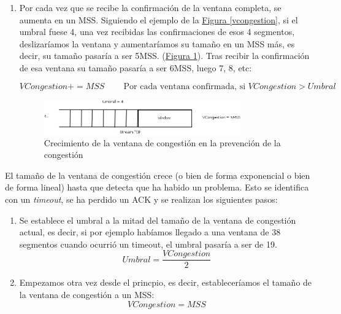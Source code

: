 \documentclass[10pt,a4paper,spanish]{report}
\begin{document}
\begin{enumerate}[\color{tema3}{$\bigstar$}]
  \item Por cada vez que se recibe la confirmación de la ventana completa, se aumenta en un MSS. Siguiendo el ejemplo de la \hyperref[vcongestion]{Figura \ref*{vcongestion}}, si el umbral fuese 4, una vez recibidas las confirmaciones de esos 4 segmentos, deslizaríamos la ventana y aumentaríamos su tamaño en un MSS más, es decir, su tamaño pasaría a ser 5MSS. (\hyperref[umbral]{Figura \ref*{umbral}}). Tras recibir la confirmación de esa ventana su tamaño pasaría a ser 6MSS, luego 7, 8, etc:

  \begin{displaymath}
    VCongestion += MSS \qquad\ \textrm{Por cada ventana confirmada, si } VCongestion > Umbral
  \end{displaymath}

  \begin{figure}[!h]
    \centering
    \includegraphics[width=0.8\textwidth]{umbral}
    \caption{Crecimiento de la ventana de congestión en la prevención de la congestión}
    \label{umbral}
  \end{figure}
\end{enumerate}

El tamaño de la ventana de congestión crece (o bien de forma exponencial o bien de forma lineal) hasta que detecta que ha habido un problema. Esto se identifica con un \textit{\textcolor{tema3}{timeout}}, se ha perdido un ACK y se realizan los siguientes pasos:
\begin{enumerate}[1.]
  \item Se establece el umbral a la mitad del tamaño de la ventana de congestión actual, es decir, si por ejemplo habíamos llegado a una ventana de 38 segmentos cuando ocurrió un timeout, el umbral pasaría a ser de 19.
  \begin{displaymath}
    Umbral = \frac{VCongestion}{2}
  \end{displaymath}
  \item Empezamos otra vez desde el princpio, es decir, estableceríamos el tamaño de la ventana de congestión a un MSS:
  \begin{displaymath}
    VCongestion = MSS
  \end{displaymath}
\end{enumerate}
\end{document}

